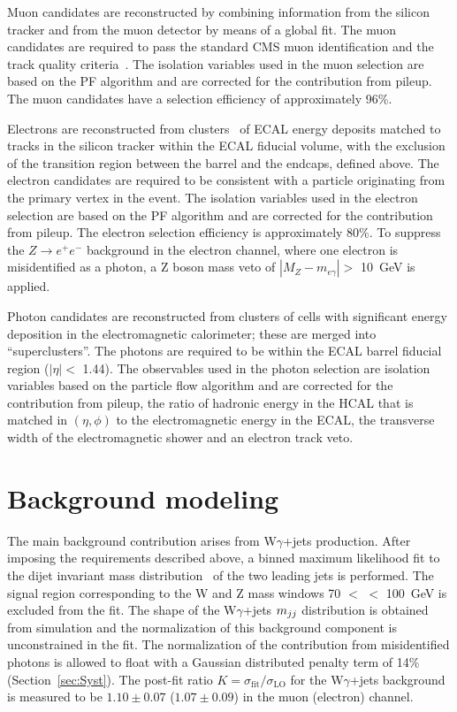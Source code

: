 Muon candidates are reconstructed by combining information from the
silicon tracker and from the muon detector by means of a global
fit. The muon candidates are required to pass the standard CMS muon
identification and the track quality criteria~\cite{muReco}. The isolation
variables used in the muon selection are based on the PF
algorithm and are corrected for the contribution from pileup. The muon
candidates have a selection efficiency of approximately 96\%.

Electrons are reconstructed from clusters~\cite{Chatrchyan:2013dga} of ECAL energy
deposits matched to tracks in the silicon tracker within the ECAL
fiducial volume, with the exclusion of the transition region between the barrel and
the endcaps, defined above. The electron candidates are
required to be consistent with a particle originating from the primary
vertex in the event. The isolation variables used in the electron selection are based on the PF
algorithm and are corrected for the contribution from pileup. 
The electron selection efficiency is approximately
80\%. To suppress the $Z\rightarrow e^+e^-$ background in the electron
channel, where one electron is misidentified as a photon, a Z boson mass veto of $|M_Z - m_{e\gamma}| >$
10~GeV is applied.

Photon candidates are reconstructed from clusters of cells with
significant energy deposition in the electromagnetic calorimeter;
these are merged into ``superclusters''. The photons are required to be within the ECAL barrel fiducial region ($|\eta| <$ 1.44). 
The observables used in the photon selection are isolation variables based on the particle flow algorithm and are corrected for 
the contribution from pileup, the ratio of hadronic energy in the HCAL that is matched in $(\eta,\phi)$ to the electromagnetic 
energy in the ECAL, the transverse width of the electromagnetic shower and an electron track veto.

\section {Background modeling}
\label{sec:BackgroundModeling}

The main background contribution arises from W$\gamma$+jets
production. After imposing the requirements described above, a binned
maximum likelihood fit to the dijet invariant mass distribution
\mjj~of the two leading jets is performed.  The signal region
corresponding to the W and Z mass windows 70 $<$ \mjj $<$ 100~GeV 
is excluded from the fit. The shape of the W$\gamma$+jets $m_{jj}$ distribution is obtained from
simulation and the normalization of this background component is unconstrained in the fit.
The normalization of the contribution from misidentified photons is allowed to float with a
Gaussian distributed penalty term of 14\% (Section~\ref{sec:Syst}). The post-fit ratio $K =
\sigma_{\textrm{fit}}/\sigma_{\textrm{LO}}$ for the W$\gamma$+jets
background is measured to be $1.10\pm 0.07$ ($1.07 \pm 0.09$) in the muon (electron) channel.

